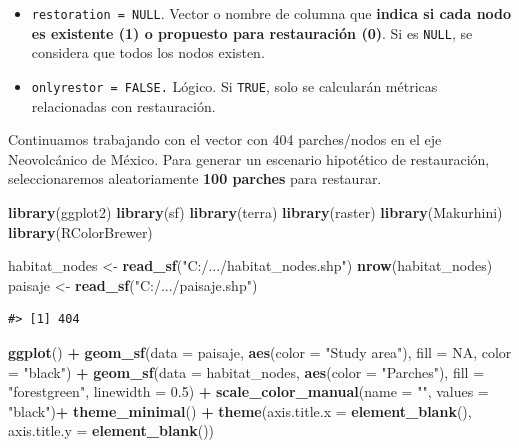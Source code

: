 \documentclass[
]{book}
\newenvironment{Shaded}{\begin{snugshade}}{\end{snugshade}}
\newcommand{\AttributeTok}[1]{\textcolor[rgb]{0.13,0.29,0.53}{#1}}
\newcommand{\ConstantTok}[1]{\textcolor[rgb]{0.56,0.35,0.01}{#1}}
\newcommand{\FloatTok}[1]{\textcolor[rgb]{0.00,0.00,0.81}{#1}}
\newcommand{\FunctionTok}[1]{\textcolor[rgb]{0.13,0.29,0.53}{\textbf{#1}}}
\newcommand{\NormalTok}[1]{#1}
\newcommand{\OtherTok}[1]{\textcolor[rgb]{0.56,0.35,0.01}{#1}}
\newcommand{\SpecialCharTok}[1]{\textcolor[rgb]{0.81,0.36,0.00}{\textbf{#1}}}
\newcommand{\StringTok}[1]{\textcolor[rgb]{0.31,0.60,0.02}{#1}}
\providecommand{\tightlist}{%
  \setlength{\itemsep}{0pt}\setlength{\parskip}{0pt}}
\begin{document}
\begin{itemize}
\tightlist
\item
  \texttt{restoration\ =\ NULL}. Vector o nombre de columna que \textbf{indica si cada nodo es existente (1) o propuesto para restauración (0)}. Si es \texttt{NULL}, se considera que todos los nodos existen.
\item
  \texttt{onlyrestor\ =\ FALSE.} Lógico. Si \texttt{TRUE}, solo se calcularán métricas relacionadas con restauración.
\end{itemize}

Continuamos trabajando con el vector con 404 parches/nodos en el eje Neovolcánico de México. Para generar un escenario hipotético de restauración, seleccionaremos aleatoriamente \textbf{100 parches} para restaurar.

\begin{Shaded}
\begin{Highlighting}[]
\FunctionTok{library}\NormalTok{(ggplot2)}
\FunctionTok{library}\NormalTok{(sf)}
\FunctionTok{library}\NormalTok{(terra)}
\FunctionTok{library}\NormalTok{(raster)}
\FunctionTok{library}\NormalTok{(Makurhini)}
\FunctionTok{library}\NormalTok{(RColorBrewer)}


\NormalTok{habitat\_nodes }\OtherTok{\textless{}{-}} \FunctionTok{read\_sf}\NormalTok{(}\StringTok{"C:/.../habitat\_nodes.shp"}\NormalTok{)}
\FunctionTok{nrow}\NormalTok{(habitat\_nodes)}
\NormalTok{paisaje }\OtherTok{\textless{}{-}} \FunctionTok{read\_sf}\NormalTok{(}\StringTok{"C:/.../paisaje.shp"}\NormalTok{)}
\end{Highlighting}
\end{Shaded}

\begin{verbatim}
#> [1] 404
\end{verbatim}

\begin{Shaded}
\begin{Highlighting}[]
\FunctionTok{ggplot}\NormalTok{() }\SpecialCharTok{+}  
  \FunctionTok{geom\_sf}\NormalTok{(}\AttributeTok{data =}\NormalTok{ paisaje, }\FunctionTok{aes}\NormalTok{(}\AttributeTok{color =} \StringTok{"Study area"}\NormalTok{), }\AttributeTok{fill =} \ConstantTok{NA}\NormalTok{, }\AttributeTok{color =} \StringTok{"black"}\NormalTok{) }\SpecialCharTok{+}
  \FunctionTok{geom\_sf}\NormalTok{(}\AttributeTok{data =}\NormalTok{ habitat\_nodes, }\FunctionTok{aes}\NormalTok{(}\AttributeTok{color =} \StringTok{"Parches"}\NormalTok{), }\AttributeTok{fill =} \StringTok{"forestgreen"}\NormalTok{, }\AttributeTok{linewidth =} \FloatTok{0.5}\NormalTok{) }\SpecialCharTok{+}
  \FunctionTok{scale\_color\_manual}\NormalTok{(}\AttributeTok{name =} \StringTok{""}\NormalTok{, }\AttributeTok{values =} \StringTok{"black"}\NormalTok{)}\SpecialCharTok{+}
  \FunctionTok{theme\_minimal}\NormalTok{() }\SpecialCharTok{+}
  \FunctionTok{theme}\NormalTok{(}\AttributeTok{axis.title.x =} \FunctionTok{element\_blank}\NormalTok{(),}
        \AttributeTok{axis.title.y =} \FunctionTok{element\_blank}\NormalTok{())}
\end{Highlighting}
\end{Shaded}
\end{document}
